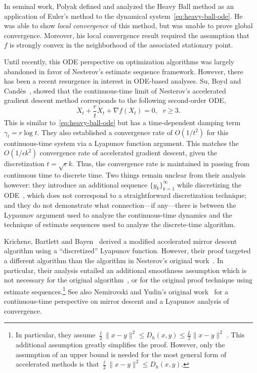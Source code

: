 \documentclass[11pt]{article}
\theoremstyle{plain}
\begin{document}
In seminal work, Polyak defined and analyzed the Heavy Ball method as an application of Euler's method to the dynamical system~\eqref{eq:heavy-ball-ode}.  He was able to show \emph{local convergence} of this method, but was unable to prove global convergence.  Moreover, his local convergence result required the assumption that $f$ is strongly convex in the neighborhood of the associated stationary point.

Until recently, this ODE perspective on optimization algorithms was largely abandoned in favor of Nesterov's estimate sequence framework.  However, there has been a recent resurgence in interest in ODE-based analyses.  Su, Boyd and Cand\`es~\cite{SuBoydCandes14}, showed that the continuous-time limit of Nesterov's accelerated gradient descent method corresponds to the following second-order ODE, 
 \begin{equation}\label{Eq:SuBoydCandes}
 \ddot X_t + \frac{r}{t} \dot X_t + \nabla f(X_t) = 0,\,\,\,\,r \geq 3.
 \end{equation}
This is similar to~\eqref{eq:heavy-ball-ode} but has a time-dependent damping term $\gamma_t = r\log t$.  They also established a convergence rate of $O(1/t^2)$ for this continuous-time system via a Lyapunov function argument. This matches the $O(1/\epsilon k^2)$ convergence rate of accelerated gradient descent, given the discretization $t= \sqrt\epsilon k$. Thus, the convergence rate is maintained in passing from continuous time to discrete time. Two things remain unclear from their analysis however:  they introduce an additional sequence $\{y_k\}_{k=1}^\infty$ while discretizing the ODE~\cite[Sec 2]{Acceleration},  which does not correspond to a straightforward discretization technique; and they do not demonstrate what connection---if any---there is between the Lypaunov argument used to analyze the continuous-time dynamics and the technique of estimate sequences used to analyze the discrete-time algorithm. 

Krichene, Bartlett and Bayen~\cite{Krichene15} derived a modified accelerated mirror descent algorithm using a ``discretized'' Lyapunov function. However, their proof targeted a different algorithm than the algorithm in Nesterov's original work~\cite{Nesterov05}. In particular, their analysis entailed an additional smoothness assumption which is not necessary for the original algorithm~\cite{Nesterov05}, or for the original proof technique using estimate sequences.\footnote{In particular, they assume $\frac{\ell }{2} \|x-y\|^2 \leq  D_h(x,y) \leq \frac{L}{2}\|x-y\|^2$%
. This additional assumption greatly simplifies the proof. However, only the assumption of an upper bound is needed for the most general form of accelerated methods is that $\frac{\ell }{2} \|x-y\|^2 \leq  D_h(x,y)$.} See also Nemirovski and Yudin's original work~\cite{NemirovskiiYudin} for a continuous-time perspective on mirror descent and a Lyapunov analysis of convergence.
\end{document}
